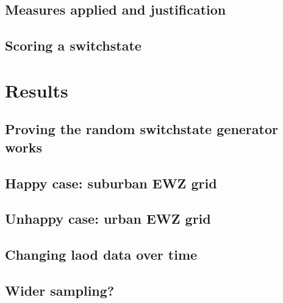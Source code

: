 \documentclass[a4paper]{report}
\begin{document}


\section{Measures applied and justification}


\section{Scoring a switchstate}


\chapter{Results}

\section{Proving the random switchstate generator works}


\section{Happy case: suburban EWZ grid}

\section{Unhappy case: urban EWZ grid}

\section{Changing laod data over time}

\section{Wider sampling?}

\printbibliography
\end{document}
